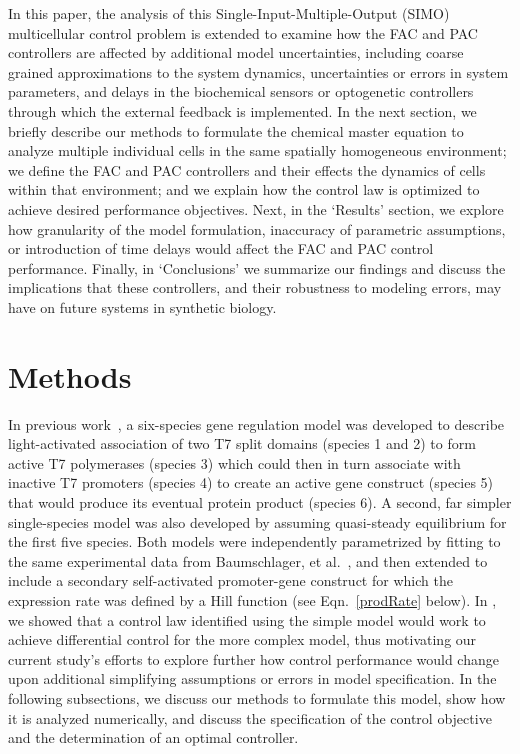 \documentclass[12pt]{article}
\begin{document}
In this paper, the analysis of this Single-Input-Multiple-Output (SIMO) multicellular control problem is extended to examine how the FAC and PAC controllers are affected by additional model uncertainties, including coarse grained approximations to the system dynamics, uncertainties or errors in system parameters, and delays in the biochemical sensors or optogenetic controllers through which the external feedback is implemented. In the next section, we briefly describe our methods to formulate the chemical master equation to analyze multiple individual cells in the same spatially homogeneous environment; we define the FAC and PAC controllers and their effects the dynamics of cells within that environment; and we explain how the control law is optimized to achieve desired performance objectives. Next, in the `Results' section, we explore how granularity of the model formulation, inaccuracy of parametric assumptions, or introduction of time delays would affect the FAC and PAC control performance. Finally, in `Conclusions' we summarize our findings and discuss the implications that these controllers, and their robustness to modeling errors, may have on future systems in synthetic biology.

\section{Methods}
In previous work~\cite{May2021}, a six-species gene regulation model was developed to describe light-activated association of two T7 split domains (species 1 and 2) to form active T7 polymerases (species 3) which could then in turn associate with inactive T7 promoters (species 4) to create an active gene construct (species 5) that would produce its eventual protein product (species 6). A second, far simpler single-species model was also developed by assuming quasi-steady equilibrium for the first five species. Both models were independently parametrized by fitting to the same experimental data from Baumschlager, et al.~\cite{XXX}, and then extended to include a secondary self-activated promoter-gene construct for which the expression rate was defined by a Hill function (see Eqn.\ \ref{prodRate} below). In \cite{May2021}, we showed that a control law identified using the simple model would work to achieve differential control for the more complex model, thus motivating our current study's efforts to explore further how control performance would change upon additional simplifying assumptions or errors in model specification.  In the following subsections, we discuss our methods to formulate this model, show how it is analyzed numerically, and discuss the specification of the control objective and the determination of an optimal controller.
\end{document}
